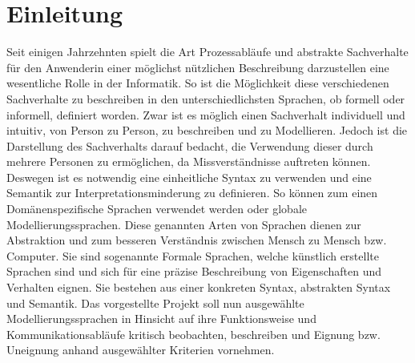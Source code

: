 \chapter{Einleitung}
\label{ch:Einleitung}
Seit einigen Jahrzehnten spielt die Art Prozessabläufe und abstrakte Sachverhalte für den Anwenderin einer möglichst nützlichen Beschreibung darzustellen eine wesentliche Rolle in der Informatik. So ist die Möglichkeit diese verschiedenen Sachverhalte zu beschreiben in den unterschiedlichsten Sprachen, ob formell oder informell, definiert worden. Zwar ist es möglich einen Sachverhalt individuell und intuitiv, von Person zu Person, zu beschreiben und zu Modellieren. Jedoch ist die Darstellung des Sachverhalts darauf bedacht, die Verwendung dieser durch mehrere Personen zu ermöglichen, da Missverständnisse auftreten können. Deswegen ist es notwendig eine einheitliche Syntax zu verwenden und eine Semantik zur Interpretationsminderung zu definieren. So können zum einen Domänenspezifische Sprachen verwendet werden oder globale Modellierungssprachen. Diese genannten Arten von Sprachen dienen zur Abstraktion und zum besseren Verständnis zwischen Mensch zu Mensch bzw. Computer. Sie sind sogenannte Formale Sprachen, welche künstlich erstellte Sprachen sind und sich für eine präzise Beschreibung von Eigenschaften und Verhalten eignen. Sie bestehen aus einer konkreten Syntax, abstrakten Syntax und Semantik. Das vorgestellte Projekt soll nun ausgewählte Modellierungssprachen in Hinsicht auf ihre Funktionsweise und  Kommunikationsabläufe kritisch beobachten, beschreiben und Eignung bzw. Uneignung anhand ausgewählter Kriterien vornehmen. 






